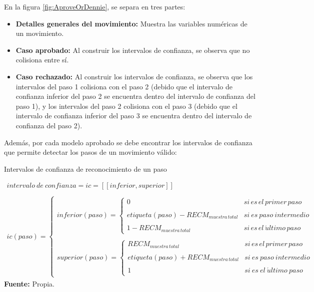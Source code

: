 En la figura \ref{fig:AproveOrDennie}, se separa en tres partes:
\begin{itemize}
\item \textbf{Detalles generales del movimiento:} Muestra las variables num\'ericas de un movimiento.
\item \textbf{Caso aprobado:} Al construir los intervalos de confianza, se observa que no colisiona entre s\'i.
\item \textbf{Caso rechazado:} Al construir los intervalos de confianza, se observa que los intervalos del paso 1 colisiona con el paso 2 (debido que el intervalo de confianza inferior del paso 2 se encuentra dentro del intervalo de confianza del paso 1), y los intervalos del paso 2 colisiona con el paso 3 (debido que el intervalo de confianza inferior del paso 3 se encuentra dentro del intervalo de confianza del paso 2).
\end{itemize}
Adem\'as, por cada modelo aprobado se debe encontrar los intervalos de confianza  que permite detectar los pasos de un movimiento v\'alido:
\begin{formula}[H]
	\centering
	\caption{Intervalos de confianza de reconocimiento de un paso}
	\label{frm:rangoConfiabilidad}
	\begin{equation}
\begin{matrix}

intervalo\: de\: confianza = ic =[[inferior,superior]] \\
\\
ic(paso)=\left\{\begin{matrix}
inferior(paso)=\left\{\begin{matrix}
0 & si\, es\, el\, primer\, paso\\ \\ 
etiqueta(paso)- RECM_{muestra\, total} & si\: es\: paso\: intermedio \\ 
\\
1-RECM_{muestra\, total}& si\, es\, el\, \acute{u}ltimo\, paso
\end{matrix}\right. \\ 
\\ 
superior(paso)=\left\{\begin{matrix}
RECM_{muestra\, total}& si\, es\, el\, primer\, paso \\
\\
etiqueta(paso)+RECM_{muestra\, total} & si\: es\: paso\: intermedio \\ \\ 
1 & si\: es\: el\: \acute{u}ltimo\: paso
\end{matrix}\right.
\end{matrix}\right.
\end{matrix}
	\end{equation}
	\textbf{Fuente:} Propia.
\end{formula} 
